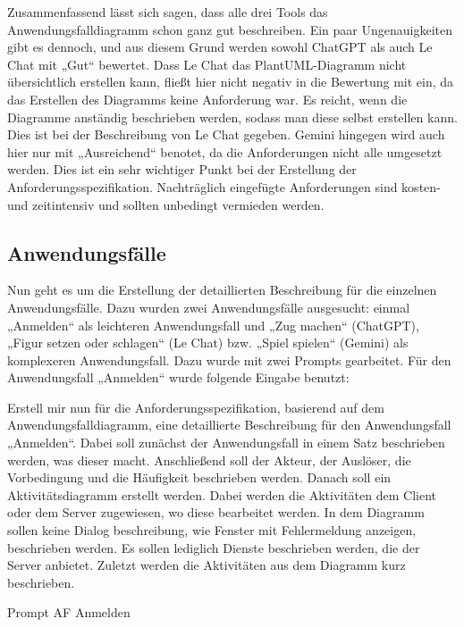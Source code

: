 Zusammenfassend lässt sich sagen, dass alle drei Tools das Anwendungsfalldiagramm schon ganz gut beschreiben. Ein paar Ungenauigkeiten gibt 
es dennoch, und aus diesem Grund werden sowohl ChatGPT als auch Le Chat mit „Gut“ bewertet. Dass Le Chat das PlantUML-Diagramm nicht übersichtlich 
erstellen kann, fließt hier nicht negativ in die Bewertung mit ein, da das Erstellen des Diagramms keine Anforderung war. Es reicht, wenn die 
Diagramme anständig beschrieben werden, sodass man diese selbst erstellen kann. Dies ist bei der Beschreibung von Le Chat gegeben. Gemini hingegen 
wird auch hier nur mit „Ausreichend“ benotet, da die Anforderungen nicht alle umgesetzt werden. Dies ist ein sehr wichtiger Punkt bei der Erstellung 
der Anforderungsspezifikation. Nachträglich eingefügte Anforderungen sind kosten- und zeitintensiv und sollten unbedingt vermieden werden.

\subsection*{Anwendungsfälle}

Nun geht es um die Erstellung der detaillierten Beschreibung für die einzelnen Anwendungsfälle. Dazu wurden zwei Anwendungsfälle ausgesucht: 
einmal „Anmelden“ als leichteren Anwendungsfall und „Zug machen“ (ChatGPT), „Figur setzen oder schlagen“ (Le Chat) bzw. „Spiel spielen“ (Gemini) 
als komplexeren Anwendungsfall. Dazu wurde mit zwei Prompts gearbeitet. Für den Anwendungsfall „Anmelden“ wurde folgende Eingabe benutzt:

\begin{prompt}[H]
    \begin{tcolorbox}[colback=gray!20, colframe=gray!20, boxrule=0pt, sharp corners] 
        Erstell mir nun für die Anforderungsspezifikation, basierend auf dem Anwendungsfalldiagramm, eine detaillierte Beschreibung für den Anwendungsfall „Anmelden“. Dabei 
        soll zunächst der Anwendungsfall in einem Satz beschrieben werden, was dieser macht. Anschließend soll der Akteur, der Auslöser, die Vorbedingung und die Häufigkeit 
        beschrieben werden. Danach soll ein Aktivitätsdiagramm erstellt werden. Dabei werden die Aktivitäten dem Client oder dem Server zugewiesen, wo diese bearbeitet werden. 
        In dem Diagramm sollen keine Dialog beschreibung, wie Fenster mit Fehlermeldung anzeigen, beschrieben werden. Es sollen lediglich Dienste beschrieben werden, die der 
        Server anbietet. Zuletzt werden die Aktivitäten aus dem Diagramm kurz beschrieben.
        \vfill
    \end{tcolorbox}
    \caption{Prompt AF Anmelden}
    \label{Prompt AF Anmelden}
\end{prompt}

